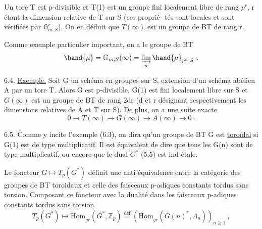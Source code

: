
Un tore  T  est p-divisible et  T(1)  est un groupe fini localement libre
de rang  $p^{r}$,  r  étant la dimension relative de  T  sur  S  (ces proprié-%
tés sont locales et sont vérifiées par  $\mathbb{G}^{r}_{m,S}$).  On en déduit que  $T(\infty)$
est un groupe de  BT  de rang  r.

Comme exemple particulier important, on a le groupe de  BT
\[ \hand{\mu} = \mathbb{G}_{m,S}(\infty) = \varinjlim_{n} \hand{\mu}_{p^{n},S} \ . \]
\margin{$\times$ \ $\mu$}

6.4.  \uline{Exemple.}  Soit  G  un schéma en groupes sur  S,  extension d'un
schéma abélien  A  par un tore  T.  Alors  G  est p-divisible,  G(1)  est
fini localement libre sur  S  et  $G(\infty)$  est un groupe de  BT  de rang
2d\hand{+}r  (d  et  r  désignant respectivement les dimensions relatives de  A
et  T  sur  S).  De plus, on a une suite exacte
\[ 0 \to T(\infty) \to G(\infty) \to A(\infty) \to 0 \ . \]

6.5.  Comme y incite l'exemple (6.3), on dira qu'un groupe de  BT
G  est \uline{toroïdal} si  G(1)  est de type multiplicatif.  Il est équivalent
de dire que tous les  G(n)  sont de type multiplicatif, ou encore que le
dual  $G^{*}$  (5.5) est ind-étale.

Le foncteur  $G \mapsto T_{p}(G^{*})$  définit une anti-équivalence entre la
catégorie des groupes de  BT  toroidaux et celle des faisceaux p-adiques
constants tordus sans torsion.  Composant ce foncteur avec la dualité
dans les faisceaux p-adiques constants tordus sans torsion
\[ T_{p}(G^{*}) \mapsto \underline{\mathrm{Hom}}_{gr}(G^{*},\mathbb{Z}_{p}) \overset{\text{def}}{=} (\underline{\mathrm{Hom}}_{gr}(G(n)^{*},\Lambda_{n}))_{n\geq 1} \ , \]

